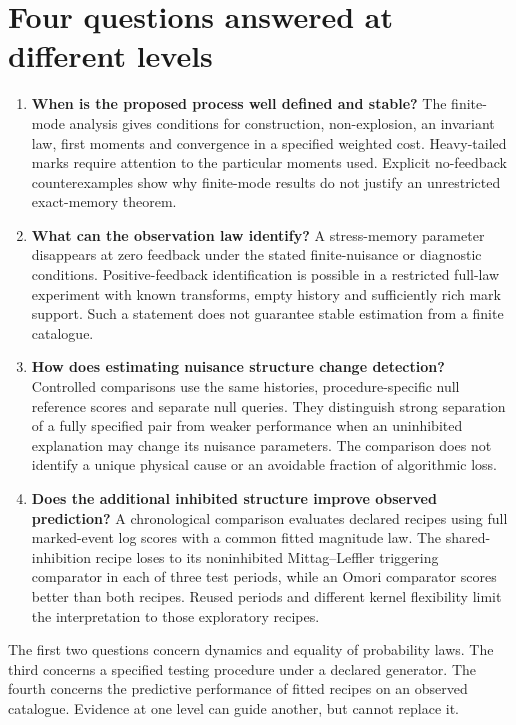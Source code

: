 \section{Four questions answered at different levels}
\label{sec:intro_questions}

\begin{enumerate}
 \item \textbf{When is the proposed process well defined and stable?} The finite-mode analysis gives conditions for construction, non-explosion, an invariant law, first moments and convergence in a specified weighted cost. Heavy-tailed marks require attention to the particular moments used. Explicit no-feedback counterexamples show why finite-mode results do not justify an unrestricted exact-memory theorem.
 \item \textbf{What can the observation law identify?} A stress-memory parameter disappears at zero feedback under the stated finite-nuisance or diagnostic conditions. Positive-feedback identification is possible in a restricted full-law experiment with known transforms, empty history and sufficiently rich mark support. Such a statement does not guarantee stable estimation from a finite catalogue.
 \item \textbf{How does estimating nuisance structure change detection?} Controlled comparisons use the same histories, procedure-specific null reference scores and separate null queries. They distinguish strong separation of a fully specified pair from weaker performance when an uninhibited explanation may change its nuisance parameters. The comparison does not identify a unique physical cause or an avoidable fraction of algorithmic loss.
 \item \textbf{Does the additional inhibited structure improve observed prediction?} A chronological comparison evaluates declared recipes using full marked-event log scores with a common fitted magnitude law. The shared-inhibition recipe loses to its noninhibited Mittag--Leffler triggering comparator in each of three test periods, while an Omori comparator scores better than both recipes. Reused periods and different kernel flexibility limit the interpretation to those exploratory recipes.
\end{enumerate}

The first two questions concern dynamics and equality of probability laws. The third concerns a specified testing procedure under a declared generator. The fourth concerns the predictive performance of fitted recipes on an observed catalogue. Evidence at one level can guide another, but cannot replace it.


